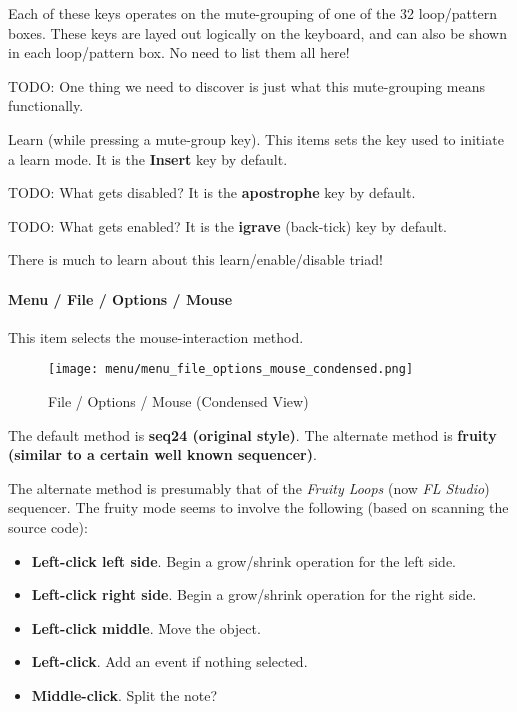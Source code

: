    Each of these keys operates on the mute-grouping of one of the 32
   loop/pattern boxes.  These keys are layed out logically on the keyboard,
   and can also be shown in each loop/pattern box.  No need to list them all
   here!

   TODO: 
   One thing we need to discover is just what this mute-grouping
   means functionally.

   Learn (while pressing a mute-group key).
   This items sets the key used to initiate a learn mode.
   It is the \textbf{Insert} key by default.

   TODO:  What gets disabled?
   It is the \textbf{apostrophe} key by default.

   TODO: What gets enabled?
   It is the \textbf{igrave} (back-tick) key by default.

   There is much to learn about this learn/enable/disable triad!

\paragraph{Menu / File / Options / Mouse }
\label{paragraph:seq24_menu_file_options_mouse}

   This item selects the mouse-interaction method.

\begin{figure}[H]
   \centering 
   \texttt{[image: menu/menu\_file\_options\_mouse\_condensed.png]}
   \caption{File / Options / Mouse (Condensed View)}
   \label{fig:seq24_menu_file_options_mouse}
\end{figure}

   The default method is \textbf{seq24 (original style)}.
   The alternate method is \textbf{fruity (similar to a certain well known
   sequencer)}.

   The alternate method is presumably that of the \textsl{Fruity Loops}
   (now \textsl{FL Studio}) sequencer.  The fruity mode seems to involve the
   following (based on scanning the source code):
   
   \begin{itemize}
      \item \textbf{Left-click left side}.
         Begin a grow/shrink operation for the left side.
      \item \textbf{Left-click right side}.
         Begin a grow/shrink operation for the right side.
      \item \textbf{Left-click middle}.
         Move the object.
      \item \textbf{Left-click}.
         Add an event if nothing selected.
      \item \textbf{Middle-click}.
         Split the note?
   \end{itemize}

